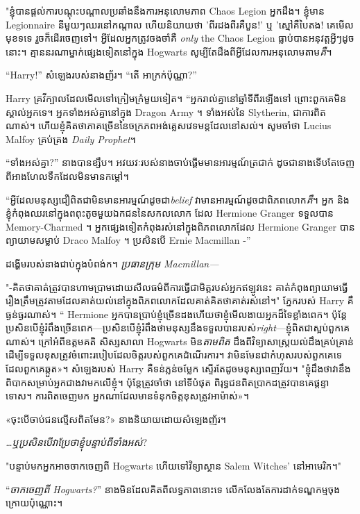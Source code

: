 {{"ខ្ញុំបានផ្តល់ការបណ្តុះបណ្តាលប្រឆាំងនឹងការអនុលោមភាព Chaos Legion អ្នកដឹង។ ខ្ញុំមាន Legionnaire នីមួយៗឈរនៅកណ្តាល ហើយនិយាយថា 'ពីរដងពីរគឺបួន!' ឬ 'ស្មៅគឺបៃតង! គេមើលមុខទទេ រួចក៏ដើរចេញទៅ។ អ្វីដែលអ្នកត្រូវចងចាំគឺ \emph{ only} the Chaos Legion ធ្លាប់បានអនុវត្តអ្វីៗដូចនោះ។ គ្មាននរណាម្នាក់ផ្សេងទៀតនៅក្នុង Hogwarts សូម្បីតែដឹងពីអ្វីដែលការអនុលោមតាម\emph{គឺ}។

“Harry!” សំឡេងរបស់នាងញ័រ។ “តើ \emph{} អាក្រក់ប៉ុណ្ណា?”

Harry គ្រវីក្បាលដែលមើលទៅក្រៀមក្រំមួយទៀត។ “អ្នក​រាល់​គ្នា​នៅ​ឆ្នាំ​ទី​ពីរ​ឡើង​ទៅ ព្រោះ​ពួក​គេ​មិន​ស្គាល់​អ្នក​ទេ។ អ្នកទាំងអស់គ្នានៅក្នុង Dragon Army ។ ទាំងអស់នៃ Slytherin, ជាការពិតណាស់។ ហើយខ្ញុំគិតថាភាគច្រើននៃចក្រភពអង់គ្លេសវេទមន្តដែលនៅសល់។ សូមចាំថា Lucius Malfoy គ្រប់គ្រង \emph{Daily Prophet}។

“ទាំងអស់គ្នា?” នាងបានខ្សឹប។ អវយវៈ​របស់​នាង​ចាប់​ផ្ដើម​មាន​អារម្មណ៍​ត្រជាក់ ដូច​ជា​នាង​ទើប​តែ​ចេញ​ពី​អាង​ហែល​ទឹក​ដែល​មិន​មាន​កម្ដៅ។

“អ្វីដែលមនុស្សជឿពិតជាមិនមានអារម្មណ៍ដូចជា\emph{belief} វាមានអារម្មណ៍ដូចជាពិភពលោក\emph{គឺ}។ អ្នក និងខ្ញុំកំពុងឈរនៅក្នុងពពុះតូចមួយឯកជននៃសកលលោក ដែល Hermione Granger ទទួលបាន Memory-Charmed ។ អ្នកផ្សេងទៀតកំពុងរស់នៅក្នុងពិភពលោកដែល Hermione Granger បានព្យាយាមសម្លាប់ Draco Malfoy ។ ប្រសិនបើ Ernie Macmillan -”

ដង្ហើមរបស់នាងជាប់ក្នុងបំពង់ក។ \emph{ប្រធានក្រុម Macmillan—}

"-គិតថាគាត់ត្រូវបានហាមប្រាមដោយសីលធម៌ពីការធ្វើជាមិត្តរបស់អ្នកឥឡូវនេះ គាត់កំពុងព្យាយាមធ្វើរឿងត្រឹមត្រូវតាមដែលគាត់យល់នៅក្នុងពិភពលោកដែលគាត់គិតថាគាត់រស់នៅ។" ភ្នែករបស់ Harry គឺធ្ងន់ធ្ងរណាស់។ “ Hermione អ្នកបានប្រាប់ខ្ញុំច្រើនដងហើយថាខ្ញុំមើលងាយអ្នកដ៏ទៃខ្លាំងពេក។ ប៉ុន្តែប្រសិនបើខ្ញុំរំពឹងច្រើនពេក—ប្រសិនបើខ្ញុំរំពឹងថាមនុស្សនឹងទទួលបានរបស់\emph{right}—ខ្ញុំពិតជាស្អប់ពួកគេណាស់។ ក្រៅអំពីឧត្តមគតិ សិស្សសាលា Hogwarts មិន\emph{តាមពិត} ដឹងពីវិទ្យាសាស្ត្រយល់ដឹងគ្រប់គ្រាន់ ដើម្បីទទួលខុសត្រូវចំពោះរបៀបដែលចិត្តរបស់ពួកគេដំណើរការ។ វា​មិន​មែន​ជា​កំហុស​របស់​ពួកគេ​ទេ​ដែល​ពួកគេ​ឆ្កួត​»។ សំឡេង​របស់ Harry គឺ​ទន់ភ្លន់​ចម្លែក ស្ទើរតែ​ដូច​មនុស្ស​ពេញវ័យ។ "ខ្ញុំដឹងថាវានឹងពិបាកសម្រាប់អ្នកជាងវាមកលើខ្ញុំ។ ប៉ុន្តែ​ត្រូវ​ចាំ​ថា នៅ​ទី​បំផុត ពិរុទ្ធជន​ពិតប្រាកដ​ត្រូវ​បាន​គេ​ផ្ដន្ទាទោស។ ការ​ពិត​ចេញ​មក អ្នក​ណា​ដែល​មាន​ទំនុក​ចិត្ត​ខុស​ត្រូវ​អាម៉ាស់»។

«ចុះ​បើ​ចាប់​ជន​ល្មើស​ពិត​មែន?» នាងនិយាយដោយសំឡេងញ័រ។

\emph{…ឬប្រសិនបើវាប្រែថាខ្ញុំបន្ទាប់ពីទាំងអស់}?

"បន្ទាប់មកអ្នកអាចចាកចេញពី Hogwarts ហើយទៅវិទ្យាស្ថាន Salem Witches' នៅអាមេរិក។"

“\emph{ចាកចេញពី Hogwarts?}” នាងមិនដែលគិតពីលទ្ធភាពនោះទេ លើកលែងតែការដាក់ទណ្ឌកម្មចុងក្រោយប៉ុណ្ណោះ។

}}
